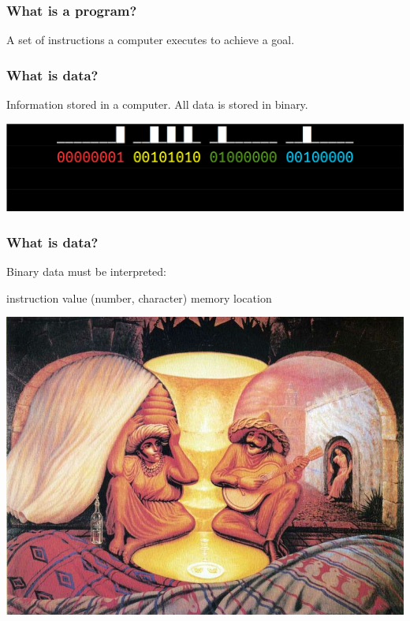 \documentclass[11pt]{beamer}
\begin{document}
\begin{frame}
  \frametitle{What is a program?}
  \Enlarge

  \begin{itemize} %
    \myitem A set of instructions a computer executes to achieve a goal.
  \end{itemize}
\end{frame}

\begin{frame}
  \frametitle{What is data?}
  \Enlarge

  \begin{itemize} %
    \myitem Information stored in a computer. %
    \myitem All data is stored in binary.
  \end{itemize}
  \includegraphics[width=\textwidth]{./img/assembler-2.png}
\end{frame}

\begin{frame}
  \frametitle{What is data?}
  \Enlarge

  \begin{itemize}
    \myitem Binary data must be interpreted:
	\begin{itemize}
	  \mysubitem instruction %
	  \mysubitem value (number, character) %
	  \mysubitem memory location %
	\end{itemize}
  \end{itemize}
  \begin{centering}
  \includegraphics[height=0.5\textheight]{./img/dali.png}
  \end{centering}
\end{frame}
\end{document}
